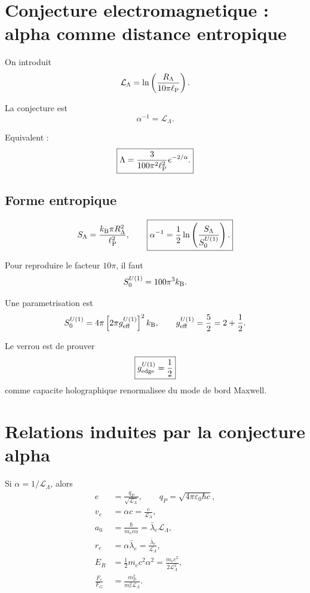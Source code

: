 \documentclass[11pt,a4paper]{article}
\newcommand{\lp}{\ell_{\rm P}}
\newcommand{\RL}{R_\Lambda}
\newcommand{\calL}{\mathcal L}
\newcommand{\kb}{k_{\rm B}}
\begin{document}
\section{Conjecture electromagnetique : alpha comme distance entropique}

On introduit
\begin{equation}
\calL_\Lambda=\ln\left(\frac{\RL}{10\pi\lp}\right).
\end{equation}

La conjecture est
\begin{equation}
\boxed{\alpha^{-1}=\calL_\Lambda.}
\end{equation}

Equivalent :
\begin{equation}
\boxed{
\Lambda=\frac{3}{100\pi^2\lp^2}e^{-2/\alpha}.
}
\end{equation}

\subsection{Forme entropique}

\begin{equation}
S_\Lambda=\frac{\kb\pi\RL^2}{\lp^2},
\qquad
\boxed{
\alpha^{-1}=\frac12\ln\left(\frac{S_\Lambda}{S_0^{U(1)}}\right).
}
\end{equation}

Pour reproduire le facteur \(10\pi\), il faut
\begin{equation}
S_0^{U(1)}=100\pi^3\kb.
\end{equation}

Une parametrisation est
\begin{equation}
S_0^{U(1)}=4\pi\left[2\pi g_{\rm eff}^{U(1)}\right]^2\kb,
\qquad
g_{\rm eff}^{U(1)}=\frac52=2+\frac12.
\end{equation}

Le verrou est de prouver
\begin{equation}
\boxed{
g_{\rm edge}^{U(1)}=\frac12
}
\end{equation}
comme capacite holographique renormalisee du mode de bord Maxwell.

\section{Relations induites par la conjecture alpha}

Si \(\alpha=1/\calL_\Lambda\), alors
\begin{align}
e&=\frac{q_P}{\sqrt{\calL_\Lambda}},
\qquad
q_P=\sqrt{4\pi\varepsilon_0\hbar c},\\
v_e&=\alpha c=\frac{c}{\calL_\Lambda},\\
a_0&=\frac{\hbar}{m_ec\alpha}=\bar\lambda_e\calL_\Lambda,\\
r_e&=\alpha\bar\lambda_e=\frac{\bar\lambda_e}{\calL_\Lambda},\\
E_R&=\frac12m_ec^2\alpha^2=\frac{m_ec^2}{2\calL_\Lambda^2},\\
\frac{F_e}{F_G}&=\frac{m_P^2}{m_e^2\calL_\Lambda}.
\end{align}
\end{document}
